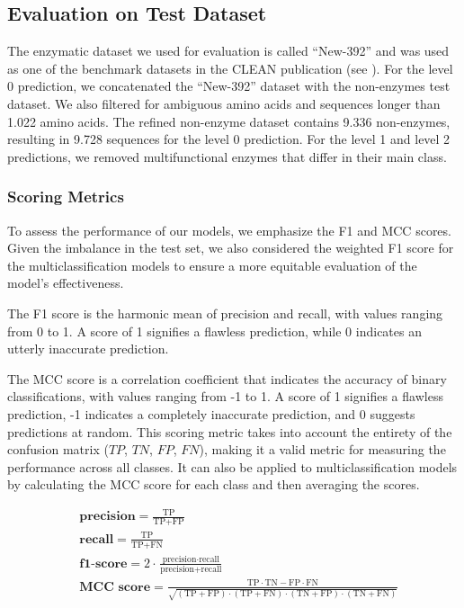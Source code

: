 \documentclass{bioinfo}
\begin{document}
\begin{methods}
\subsection{Evaluation on Test Dataset}
The enzymatic dataset we used for evaluation is called ``New-392'' and was used as one of the benchmark datasets 
in the CLEAN publication (see \cite{CleanArticle}).
For the level 0 prediction, we concatenated the ``New-392'' dataset with the non-enzymes test dataset.
We also filtered for ambiguous amino acids and sequences longer than 1.022 amino acids.
The refined non-enzyme dataset contains 9.336 non-enzymes, resulting in 9.728 sequences for the level 0 prediction.
For the level 1 and level 2 predictions, we removed multifunctional enzymes that differ in their main class.

\subsubsection{Scoring Metrics}

To assess the performance of our models, we emphasize the F1 and MCC scores. 
Given the imbalance in the test set, we also considered the weighted F1 score for the multiclassification models
to ensure a more equitable evaluation of the model's effectiveness.

The F1 score is the harmonic mean of precision and recall, with values ranging from 0 to 1.
A score of 1 signifies a flawless prediction, while 0 indicates an utterly inaccurate prediction.

The MCC score is a correlation coefficient that indicates the accuracy of binary classifications, with values ranging from -1 to 1. 
A score of 1 signifies a flawless prediction, -1 indicates a completely inaccurate prediction, and 0 suggests predictions at random.
This scoring metric takes into account the entirety of the confusion matrix ($TP$, $TN$, $FP$, $FN$), making it a valid
metric for measuring the performance across all classes.
It can also be applied to multiclassification models by calculating the MCC score for each class and then averaging the scores.

\begin{align}
	&\textbf{precision} = \frac{\text{TP}}{\text{TP} + \text{FP}} \\
    &\textbf{recall} = \frac{\text{TP}}{\text{TP} + \text{FN}} \\
    &\textbf{f1-score} = 2 \cdot \frac{\text{precision} \cdot \text{recall}}{\text{precision} + \text{recall}} \\
    &\textbf{MCC score} = \frac{\text{TP} \cdot \text{TN} - \text{FP} \cdot \text{FN}}{\sqrt{(\text{TP} + \text{FP}) \cdot (\text{TP} + \text{FN}) \cdot (\text{TN} + \text{FP}) \cdot (\text{TN} + \text{FN})}}
\end{align}


\end{methods}
\end{document}
